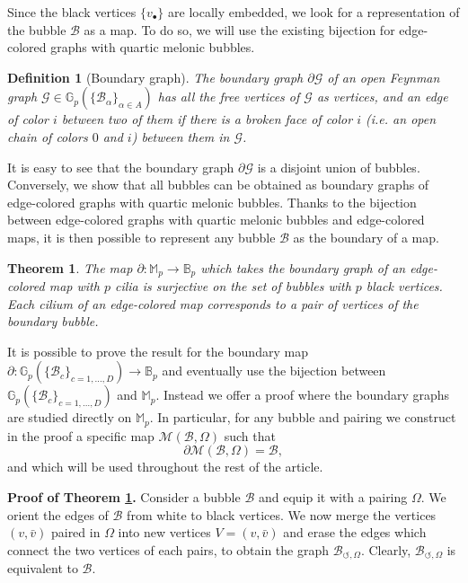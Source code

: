 \documentclass[aps,prd,10pt,notitlepage,nofootinbib,superscriptaddress,showkeys,showpacs]{revtex4-1}
\newtheorem{definition}{Definition}
\newtheorem{theorem}{Theorem}
\begin{document}
Since the black vertices $\{v_\bullet\}$ are locally embedded, we look for a representation of the bubble ${\mathcal{B}}$ as a map. To do so, we will use the existing bijection for edge-colored graphs with quartic melonic bubbles.

\begin{definition}[Boundary graph]
The boundary graph $\partial {\mathcal{G}}$ of an open Feynman graph ${\mathcal{G}}\in{\mathbb{G}}_p(\{{\mathcal{B}}_\alpha\}_{\alpha\in A})$ has all the free vertices of ${\mathcal{G}}$ as vertices, and an edge of color $i$ between two of them if there is a broken face of color $i$ (i.e. an open chain of colors $0$ and $i$) between them in ${\mathcal{G}}$. 
\end{definition}

It is easy to see that the boundary graph $\partial {\mathcal{G}}$ is a disjoint union of bubbles. Conversely, we show that all bubbles can be obtained as boundary graphs of edge-colored graphs with quartic melonic bubbles. Thanks to the bijection between edge-colored graphs with quartic melonic bubbles and edge-colored maps, it is then possible to represent any bubble ${\mathcal{B}}$ as the boundary of a map. 

\begin{theorem} \label{thm:BoundaryGraphs}
The map $\partial: {\mathbb{M}}_p \to {\mathbb{B}}_p$ which takes the boundary graph of an edge-colored map with $p$ cilia is surjective on the set of bubbles with $p$ black vertices. Each cilium of an edge-colored map corresponds to a pair of vertices of the boundary bubble.
\end{theorem}

It is possible to prove the result for the boundary map $\partial: {\mathbb{G}}_p(\{{\mathcal{B}}_c\}_{c=1,\dotsc,D}) \to {\mathbb{B}}_p$ and eventually use the bijection between ${\mathbb{G}}_p(\{{\mathcal{B}}_c\}_{c=1,\dotsc,D})$ and ${\mathbb{M}}_p$. Instead we offer a proof where the boundary graphs are studied directly on ${\mathbb{M}}_p$. In particular, for any bubble and pairing we construct in the proof a specific map ${\mathcal{M}}({\mathcal{B}}, \Omega)$ such that
\begin{equation}
\partial {\mathcal{M}}({\mathcal{B}}, \Omega) = {\mathcal{B}},
\end{equation}
and which will be used throughout the rest of the article.

{\bf Proof of Theorem \ref{thm:BoundaryGraphs}.} Consider a bubble ${\mathcal{B}}$ and equip it with a pairing $\Omega$. We orient the edges of ${\mathcal{B}}$ from white to black vertices. We now merge the vertices $(v, \bar{v})$ paired in $\Omega$ into new vertices $V=(v, \bar{v})$ and erase the edges which connect the two vertices of each pairs, to obtain the graph ${\mathcal{B}}_{\circlearrowleft, \Omega}$. Clearly, ${\mathcal{B}}_{\circlearrowleft, \Omega}$ is equivalent to ${\mathcal{B}}$.
\end{document}
